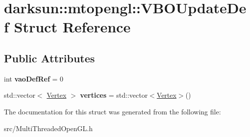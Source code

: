 \hypertarget{structdarksun_1_1mtopengl_1_1_v_b_o_update_def}{}\section{darksun\+::mtopengl\+::V\+B\+O\+Update\+Def Struct Reference}
\label{structdarksun_1_1mtopengl_1_1_v_b_o_update_def}
\subsection*{Public Attributes}
\begin{DoxyCompactItemize}
\item 
\mbox{\label{structdarksun_1_1mtopengl_1_1_v_b_o_update_def_ab0290c450fc2f1e908c834de52452274}} 
int {\bfseries vao\+Def\+Ref} = 0
\item 
\mbox{\label{structdarksun_1_1mtopengl_1_1_v_b_o_update_def_ab542052f49edc59bc2c61402ac6893d2}} 
std\+::vector$<$ \mbox{\hyperlink{structdarksun_1_1_vertex}{Vertex}} $>$ {\bfseries vertices} = std\+::vector$<$\mbox{\hyperlink{structdarksun_1_1_vertex}{Vertex}}$>$()
\end{DoxyCompactItemize}


The documentation for this struct was generated from the following file\+:\begin{DoxyCompactItemize}
\item 
src/Multi\+Threaded\+Open\+G\+L.\+h\end{DoxyCompactItemize}
